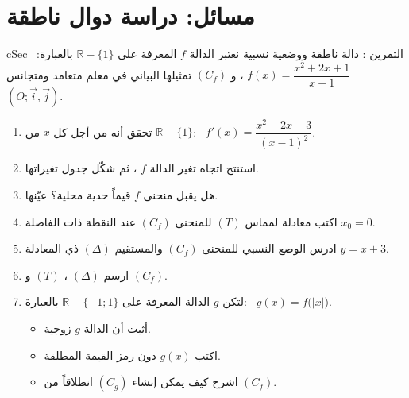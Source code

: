 \documentclass[12pt,a4paper]{article}
\newenvironment{BOX}[2]{\begin{otherlanguage}{english}\begin{arbox}{#1}{#2}}{\end{arbox}\end{otherlanguage}}
\newcounter{exo}
\newenvironment{tamrin}[1]{\stepcounter{exo}\begin{BOX}{cSec}{التمرين \theexo: #1}}{\end{BOX}}
\newcommand{\R}{\mathbb{R}}
\newenvironment{sq}{\begin{itemize}[leftmargin=2.4em,itemsep=3pt]}{\end{itemize}}
\newcommand{\qa}{\item[(أ)]}\newcommand{\qb}{\item[(ب)]}\newcommand{\qc}{\item[(جـ)]}\newcommand{\qd}{\item[(د)]}\newcommand{\qe}{\item[(هـ)]}
\begin{document}
\section{مسائل: دراسة دوال ناطقة}
\begin{tamrin}{دالة ناطقة ووضعية نسبية}
نعتبر الدالة $f$ المعرفة على $\R-\{1\}$ بالعبارة: \ $f(x)=\dfrac{x^2+2x+1}{x-1}$ ، و $(C_f)$ تمثيلها البياني في معلم متعامد ومتجانس $(O;\vec i,\vec j)$.
\begin{enumerate}
\item تحقق أنه من أجل كل $x$ من $\R-\{1\}$: \ $f'(x)=\dfrac{x^2-2x-3}{(x-1)^2}$.
\item استنتج اتجاه تغير الدالة $f$ ، ثم شكّل جدول تغيراتها.
\item هل يقبل منحنى $f$ قيماً حدية محلية؟ عيّنها.
\item اكتب معادلة لمماس $(T)$ للمنحنى $(C_f)$ عند النقطة ذات الفاصلة $x_0=0$.
\item ادرس الوضع النسبي للمنحنى $(C_f)$ والمستقيم $(\Delta)$ ذي المعادلة $y=x+3$.
\item ارسم $(\Delta)$ ، $(T)$ و $(C_f)$.
\item لتكن $g$ الدالة المعرفة على $\R-\{-1;1\}$ بالعبارة: \ $g(x)=f\big(|x|\big)$.
\begin{sq}
\qa أثبت أن الدالة $g$ زوجية.
\qb اكتب $g(x)$ دون رمز القيمة المطلقة.
\qc اشرح كيف يمكن إنشاء $(C_g)$ انطلاقاً من $(C_f)$.
\end{sq}
\end{enumerate}
\end{tamrin}
\end{document}
